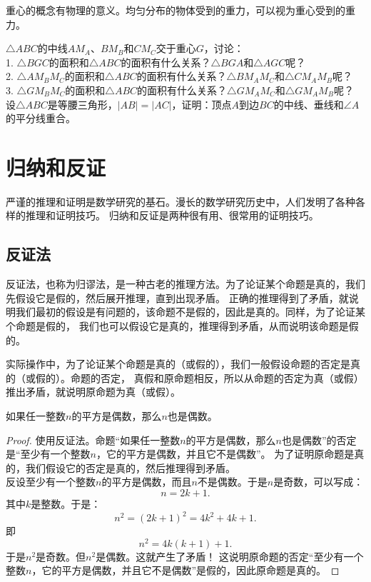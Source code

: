 \documentclass[12pt,UTF8,fontset=none]{ctexbook}
\begin{document}
重心的概念有物理的意义。均匀分布的物体受到的重力，可以视为重心受到的重力。
\begin{xt}\label{xt:1-3-0}
    $\triangle ABC$的中线$AM_A$、$BM_B$和$CM_C$交于重心$G$，讨论：\\
    1. $\triangle BGC$的面积和$\triangle ABC$的面积有什么关系？$\triangle BGA$和$\triangle AGC$呢？\\
    2. $\triangle AM_BM_C$的面积和$\triangle ABC$的面积有什么关系？$\triangle BM_AM_C$和$\triangle CM_AM_B$呢？\\
    3. $\triangle GM_BM_C$的面积和$\triangle ABC$的面积有什么关系？$\triangle GM_AM_C$和$\triangle GM_AM_B$呢？\\
    设$\triangle ABC$是等腰三角形，$|AB| = |AC|$，证明：顶点$A$到边$BC$的中线、垂线和$\angle A$的平分线重合。\\
\end{xt}

\chapter{归纳和反证}
严谨的推理和证明是数学研究的基石。漫长的数学研究历史中，人们发明了各种各样的推理和证明技巧。
归纳和反证是两种很有用、很常用的证明技巧。

\section{反证法}
反证法，也称为归谬法，是一种古老的推理方法。为了论证某个命题是真的，我们先假设它是假的，然后展开推理，直到出现矛盾。
正确的推理得到了矛盾，就说明我们最初的假设是有问题的，该命题不是假的，因此是真的。同样，为了论证某个命题是假的，
我们也可以假设它是真的，推理得到矛盾，从而说明该命题是假的。

实际操作中，为了论证某个命题是真的（或假的），我们一般假设命题的否定是真的（或假的）。命题的否定，
真假和原命题相反，所以从命题的否定为真（或假）推出矛盾，就说明原命题为真（或假）。

\begin{ex}\label{ex:2-0-0}
    如果任一整数$n$的平方是偶数，那么$n$也是偶数。
\end{ex}
\begin{proof}
    使用反证法。命题“如果任一整数$n$的平方是偶数，那么$n$也是偶数”的否定是“至少有一个整数$n$，它的平方是偶数，并且它不是偶数”。
    为了证明原命题是真的，我们假设它的否定是真的，然后推理得到矛盾。\\
    反设至少有一个整数$n$的平方是偶数，而且$n$不是偶数。于是$n$是奇数，可以写成：
    $$ n = 2k+1.$$
    其中$k$是整数。于是：
    $$ n^2 = (2k+1)^2 = 4k^2 + 4k + 1.$$
    即
    $$ n^2 = 4k(k+1)+1.$$
    于是$n^2$是奇数。但$n^2$是偶数。这就产生了矛盾！
    这说明原命题的否定“至少有一个整数$n$，它的平方是偶数，并且它不是偶数”是假的，因此原命题是真的。
\end{proof}
\end{document}
